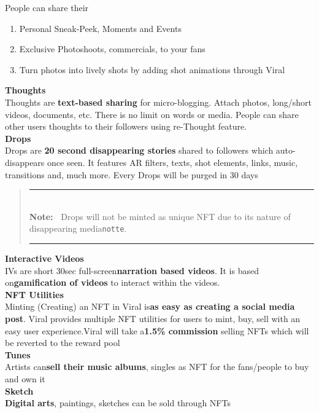 \documentclass[10pt]{article}
\newlength{\Lnote}
\newcommand{\notte}[1]
     {\addtolength{\leftmargini}{1em}
        \settowidth{\Lnote}{\textbf{Note:~}}
        \begin{quote}
            \rule{\dimexpr\textwidth-2\leftmargini}{1pt}\\
                        \mbox{}\hspace{-\Lnote}\textbf{Note:~}%
                                            #1\\[-0.5ex] 
            \rule{\dimexpr\textwidth-2\leftmargini}{1pt}
        \end{quote}
        \addtolength{\leftmargini}{-4em}}
\begin{document}
People can share their
\begin{enumerate}[leftmargin=+0.2in]
\item Personal Sneak-Peek, Moments and Events
\item Exclusive Photoshoots, commercials, to your fans
\item Turn photos into lively shots by adding shot animations through Viral
\end{enumerate}

\textbf{Thoughts}\\
Thoughts are \textbf{text-based sharing} for micro-blogging. Attach photos, long/short videos, documents, etc. There is no limit on words or media. People can share other users thoughts to their followers using re-Thought feature.\\


\textbf{Drops}\\

Drops are \textbf{20 second disappearing stories} shared to followers which auto-disappears once seen. It features AR filters, texts, shot elements, links, music, transitions and, much more. Every Drops will be purged in 30 days\\

\notte{Drops will not be minted as unique NFT due to it\textsc{\char13}s nature of disappearing media\texttt{notte}.}

\textbf{Interactive Videos}\\

IVs are short 30sec full-screen\textbf{narration based videos}. It is based on\textbf{gamification of videos} to interact within the videos.\\


\textbf{NFT Utilities}\\

Minting (Creating) an NFT in Viral is\textbf{as easy as creating a social media post}. Viral provides multiple NFT utilities for users to mint, buy, sell with an easy user experience.Viral will take a\textbf{1.5\% commission} selling NFTs which will be reverted to the reward pool\\


\textbf{Tunes}\\
Artists can\textbf{sell their music albums}, singles as NFT for the fans/people to buy and own it\\


\textbf{Sketch}\\
\textbf{Digital arts}, paintings, sketches can be sold through NFTs\\
\end{document}
